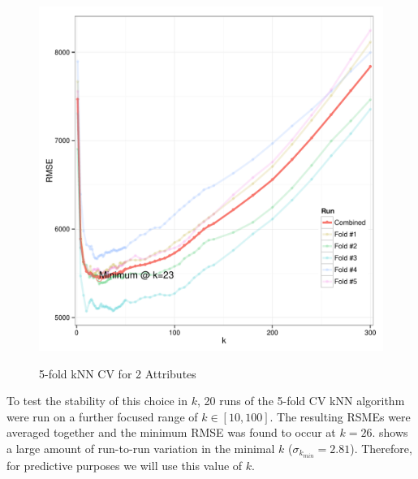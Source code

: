 \documentclass[11pt, fleqn]{article}
\begin{document}
\begin{figure}[!htb]
  \centering
  \caption{5-fold kNN CV for 2 Attributes}
  \includegraphics[scale=.5]{2p_cv_k.pdf}
  \label{fig:2p_k}
\end{figure}

To test the stability of this choice in $k$, 20 runs of the 5-fold CV kNN algorithm were run on a further focused range of $k\in[10,100]$.  The resulting RSMEs were averaged together and the minimum RMSE was found to occur at $k=26$.   shows a large amount of run-to-run variation in the minimal $k$  ($\sigma_{k_{min}}=2.81$).  Therefore, for predictive purposes we will use this value of $k$.
\end{document}
